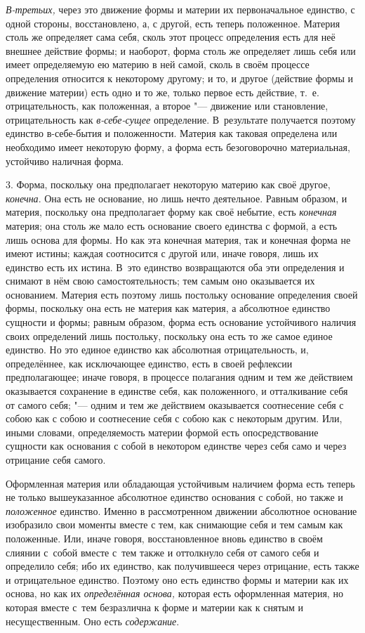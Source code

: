 {\em В-третьих,} через это движение формы и материи их первоначальное единство,
с одной стороны, восстановлено, а, с другой, есть теперь положенное. Материя
столь же определяет сама себя, сколь этот процесс определения есть для неё
внешнее действие формы; и наоборот, форма столь же определяет лишь себя или
имеет определяемую ею материю в ней самой, сколь в своём процессе определения
относится к некоторому другому; и то, и другое (действие формы и движение
материи) есть одно и то же, только первое есть действие, т.~е. отрицательность,
как положенная, а второе "--- движение или становление, отрицательность как
{\em в-себе-сущее} определение. В~результате получается поэтому единство
в-себе-бытия и положенности. Материя как таковая определена или необходимо
имеет некоторую форму, а форма есть безоговорочно материальная, устойчиво
наличная форма.

3. Форма, поскольку она предполагает некоторую материю как своё другое,
{\em конечна}. Она есть не основание, но лишь нечто деятельное. Равным образом,
и материя, поскольку она предполагает форму как своё небытие, есть
{\em конечная} материя; она столь же мало есть основание своего единства с
формой, а есть лишь основа для формы. Но как эта конечная материя, так и
конечная форма не имеют истины; каждая соотносится с другой или, иначе говоря,
лишь их единство есть их истина. В~это единство возвращаются оба эти
определения и снимают в нём свою самостоятельность; тем самым оно оказывается
их основанием. Материя есть поэтому лишь постольку основание определения своей
формы, поскольку она есть не материя как материя, а абсолютное единство
сущности и формы; равным образом, форма есть основание устойчивого наличия
своих определений лишь постольку, поскольку она есть то же самое единое
единство. Но это единое единство как абсолютная отрицательность, и,
определённее, как исключающее единство, есть в своей рефлексии предполагающее;
иначе говоря, в процессе полагания одним и тем же действием оказывается
сохранение в единстве себя, как положенного, и отталкивание себя от самого
себя; "--- одним и тем же действием оказывается соотнесение себя с собою как с
собою и соотнесение себя с собою как с некоторым другим. Или, иными словами,
определяемость материи формой есть опосредствование сущности как основания с
собой в некотором единстве через себя само и через отрицание себя самого.

Оформленная материя или обладающая устойчивым наличием форма есть теперь не
только вышеуказанное абсолютное единство основания с собой, но также и
{\em положенное} единство. Именно в рассмотренном движении абсолютное основание
изобразило свои моменты вместе с тем, как снимающие себя и тем самым как
положенные. Или, иначе говоря, восстановленное вновь единство в своём слиянии
с~собой вместе с~тем также и оттолкнуло себя от самого себя и определило себя;
ибо их единство, как получившееся через отрицание, есть также и отрицательное
единство. Поэтому оно есть единство формы и материи как их основа, но как их
{\em определённая основа,} которая есть оформленная материя, но которая вместе
с~тем безразлична к форме и материи как к снятым и несущественным. Оно есть
{\em содержание}.

